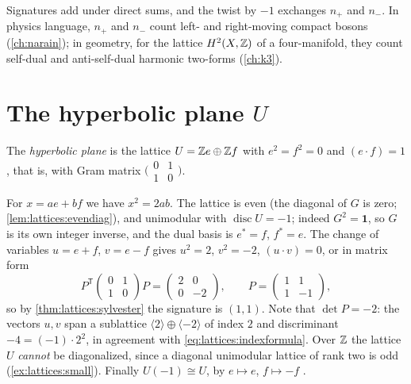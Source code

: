 Signatures add under direct sums, and the twist by $-1$ exchanges $n_+$ and $n_-$.
In physics language, $n_+$ and $n_-$ count left- and right-moving compact bosons
(\cref{ch:narain}); in geometry, for the lattice $H^2(X,\mathbb{Z})$ of a four-manifold, they count
self-dual and anti-self-dual harmonic two-forms (\cref{ch:k3}).

\section{The hyperbolic plane \texorpdfstring{$U$}{U}}\label{sec:lattices:U}

\begin{definition}\label{def:lattices:U}
The \emph{hyperbolic plane} is the lattice $U=\mathbb{Z} e\oplus\mathbb{Z} f$
with $e^2=f^2=0$ and $(e\cdot f)=1$, that is, with Gram matrix
$\bigl(\begin{smallmatrix}0&1\\1&0\end{smallmatrix}\bigr)$.
\end{definition}

For $x=ae+bf$ we have $x^2=2ab$. The lattice is even (the diagonal of $G$ is zero;
\cref{lem:lattices:evendiag}), and unimodular with $\operatorname{disc}U=-1$; indeed $G^2=
\mathbf1$, so $G$ is its own integer inverse, and the dual basis is $e^*=f$, $f^*=e$. The
change of variables $u=e+f$, $v=e-f$ gives $u^2=2$, $v^2=-2$, $(u\cdot v)=0$, or in matrix form
\begin{equation}\label{eq:lattices:Ucongruence}
 P^{\mathsf T}\begin{pmatrix}0&1\\1&0\end{pmatrix}P=\begin{pmatrix}2&0\\0&-2\end{pmatrix},
 \qquad P=\begin{pmatrix}1&1\\1&-1\end{pmatrix},
\end{equation}
so by \cref{thm:lattices:sylvester} the signature is $(1,1)$. Note that $\det P=-2$: the
vectors $u,v$ span a sublattice $\langle2\rangle\oplus\langle-2\rangle$ of index $2$ and
discriminant $-4=(-1)\cdot2^2$, in agreement with \eqref{eq:lattices:indexformula}. Over
$\mathbb{Z}$ the lattice $U$ \emph{cannot} be diagonalized, since a diagonal unimodular lattice of
rank two is odd (\cref{ex:lattices:small}). Finally $U(-1)\cong U$, by $e\mapsto e$,
$f\mapsto-f$ .

